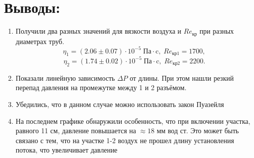 \documentclass[a4paper,12pt]{article}
\begin{document}
\section{Выводы:}
\begin{enumerate}
\itemsep0em
\item Получили два разных значений для вязкости воздуха и $Re_\text{кр}$ при разных диаметрах труб.
\[
	\eta_1 = (2.06 \pm 0.07) \cdot 10^{-5} \; \text{Па} \cdot \text{c}, \; Re_\text{кр1} = 1700,
\]\[
	\eta_2 = (1.74 \pm 0.02) \cdot 10^{-5} \; \text{Па} \cdot \text{c}, \; Re_\text{кр2} = 2200.
\]

\item Показали линейную зависимость $\Delta P$ от длины. При этом нашли резкий перепад давления на промежутке между 1 и 2 разъёмом.
\item Убедились, что в данном случае можно использовать закон Пуазейля 
\item На последнем графике обнаружили особенность, что при включении участка, равного 11 см, давление повышается на $\approx 18$ мм вод ст. Это может быть связано с тем, что на участке 1-2 воздух не прошел длину установления потока, что увеличивает давление 

\end{enumerate}
\end{document}
